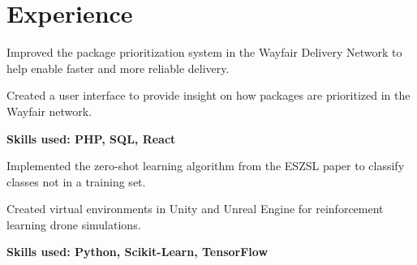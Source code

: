 \documentclass[letterpaper]{deedy-resume} %
\begin{document}
\begin{minipage}[t]{0.66\textwidth} %


\section{\faBriefcase \hspace{1mm} Experience}


\vspace{\topsep} %
\begin{tightitemize}
\item Improved the package prioritization system in the Wayfair Delivery Network to help enable faster and more reliable delivery.
\item Created a user interface to provide insight on how packages are prioritized in the Wayfair network.
\item \textbf{Skills used: PHP, SQL, React}
\end{tightitemize}
\sectionspace %


\begin{tightitemize}
\item Implemented the zero-shot learning algorithm from the ESZSL paper to classify classes not in a training set.
\item Created virtual environments in Unity and Unreal Engine for reinforcement learning drone simulations.
\item \textbf{Skills used: Python, Scikit-Learn, TensorFlow}
\end{tightitemize}

\sectionspace %





\end{minipage}
\end{document}

